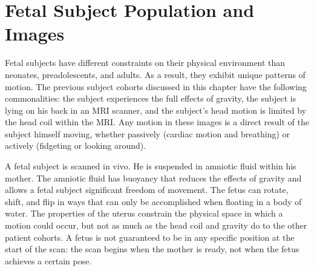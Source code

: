 
\section{Fetal Subject Population and Images}


Fetal subjects have different constraints on their physical environment than neonates, preadolescents, and adults. As a result, they exhibit unique patterns of motion. The previous subject cohorts discussed in this chapter have the following commonalities: the subject experiences the full effects of gravity, the subject is lying on his back in an MRI scanner, and the subject's head motion is limited by the head coil within the MRI. Any motion in these images is a direct result of the subject himself moving, whether passively (cardiac motion and breathing) or actively (fidgeting or looking around).

A fetal subject is scanned in vivo. He is suspended in amniotic fluid within his mother. The amniotic fluid has buoyancy that reduces the effects of gravity and allows a fetal subject significant freedom of movement. The fetus can rotate, shift, and flip in ways that can only be accomplished when floating in a body of water. The properties of the uterus constrain the physical space in which a motion could occur, but not as much as the head coil and gravity do to the other patient cohorts. A fetus is not guaranteed to be in any specific position at the start of the scan: the scan begins when the mother is ready, not when the fetus achieves a certain pose. 


